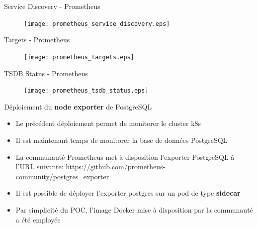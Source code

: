 \begin{frame}[fragile]{Service Discovery - Prometheus}

\begin{figure}
\begin{center}
\texttt{[image: prometheus\_service\_discovery.eps]}
\end{center}
\end{figure}

\end{frame}


\begin{frame}[fragile]{Targets - Prometheus}

\begin{figure}
\begin{center}
\texttt{[image: prometheus\_targets.eps]}
\end{center}
\end{figure}

\end{frame}


\begin{frame}[fragile]{TSDB Status - Prometheus}

\begin{figure}
\begin{center}
\texttt{[image: prometheus\_tsdb\_status.eps]}
\end{center}
\end{figure}

\end{frame}


\begin{frame}[fragile]{Déploiement du \textbf{node exporter} de PostgreSQL}

\begin{itemize}
   \item Le précédent déploiement permet de monitorer le cluster k8s
   \item Il est maintenant temps de monitorer la base de données PostgreSQL
   \item La communauté Prometheus met à disposition l'exporter PostgreSQL à l'URL suivante:
   \url{https://github.com/prometheus-community/postgres_exporter}
   \item Il est possible de déployer l'exporter postgres sur un pod de type \textbf{sidecar}
   \item Par simplicité du POC, l'image Docker mise à disposition par la communauté a été employée
\end{itemize}

\end{frame}

